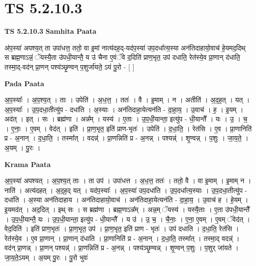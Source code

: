 \documentclass[17pt]{extarticle}
\begin{document}
\section{ TS 5.2.10.3 }

\textbf{TS 5.2.10.3 } \newline
\textbf{Samhita Paata} \newline

अ॑प॒स्या॑ अपश्य॒त् ता उपा॑धत्त॒ ततो॒ वा इ॒मां नात्य॑दह॒द्-यद॑प॒स्या॑ उप॒दधा᳚त्य॒स्या अन॑तिदाहायो॒वाच॑ हे॒यमद॒दिथ् स ब्रह्म॒णाऽन्नं॒ ॅयस्यै॒ता उ॑पधी॒यान्तै॒ य उ॑ चैना ए॒वंॅवे द॒दिति॑ प्राण॒भृत॒ उप॑ दधाति॒ रेत॑स्ये॒व प्रा॒णान् द॑धाति॒ तस्मा॒द्-वद॑न् प्रा॒णन् पश्य॑ञ्छृ॒ण्वन् प॒शुर्जा॑यते॒ ऽयं पु॒रो - [  ] \newline

\textbf{Pada Paata} \newline

अ॒प॒स्याः᳚ । अ॒प॒श्य॒त् । ताः । उपेति॑ । अ॒ध॒त्त॒ । ततः॑ । वै । इ॒माम् । न । अतीति॑ । अ॒द॒ह॒त् । यत् । अ॒प॒स्याः᳚ । उ॒प॒दधा॒तीत्यु॑प - दधा॑ति । अ॒स्याः । अन॑तिदाहा॒येत्यन॑ति - दा॒हा॒य॒ । उ॒वाच॑ । ह॒ । इ॒यम् । अद॑त् । इत् । सः । ब्रह्म॑णा । अन्न᳚म् । यस्य॑ । ए॒ताः । उ॒प॒धी॒यान्ता॒ इत्यु॑प - धी॒यान्तै᳚ । यः । उ॒ । च॒ । ए॒नाः॒ । ए॒वम् । वेद॑त् । इति॑ । प्रा॒ण॒भृत॒ इति॑ प्राण-भृतः॑ । उपेति॑ । द॒धा॒ति॒ । रेत॑सि । ए॒व । प्रा॒णानिति॑ प्र - अ॒नान् । द॒धा॒ति॒ । तस्मा᳚त् । वदन्न्॑ । प्रा॒णन्निति॑ प्र - अ॒नन्न् । पश्यन्न्॑ । शृ॒ण्वन्न् । प॒शुः । जा॒य॒ते॒ । अ॒यम् । पु॒रः ।  \newline


\textbf{Krama Paata} \newline

अ॒प॒स्या॑ अपश्यत् । अ॒प॒श्य॒त् ताः । ता उप॑ । उपा॑धत्त । अ॒ध॒त्त॒ ततः॑ । ततो॒ वै । वा इ॒माम् । इ॒माम् न । नाति॑ । अत्य॑दहत् । अ॒द॒ह॒द् यत् । यद॑प॒स्याः᳚ । अ॒प॒स्या॑ उप॒दधा॑ति । उ॒प॒दधा᳚त्य॒स्याः । उ॒प॒दधा॒तीत्यु॑प - दधा॑ति । अ॒स्या अन॑तिदाहाय । अन॑तिदाहायो॒वाच॑ । अन॑तिदाहा॒येत्यन॑ति - दा॒हा॒य॒ । उ॒वाच॑ ह । हे॒यम् । इ॒यमद॑त् । अद॒दित् । इथ् सः । स ब्रह्म॑णा । ब्रह्म॒णाऽन्न᳚म् । अन्न॒म् ॅयस्य॑ । यस्यै॒ताः । ए॒ता उ॑पधी॒यान्तै᳚ । उ॒प॒धी॒यान्तै॒ यः । उ॒प॒धी॒यान्ता॒ इत्यु॑प - धी॒यान्तै᳚ । य उ॑ । उ॒ च॒ । चै॒नाः॒ । ए॒ना॒ ए॒वम् । ए॒वम् ॅवेद॑त् । वेद॒दिति॑ । इति॑ प्राण॒भृतः॑ । प्रा॒ण॒भृत॒ उप॑ । प्रा॒ण॒भृत॒ इति॑ प्राण - भृतः॑ । उप॑ दधाति । द॒धा॒ति॒ रेत॑सि । रेत॑स्ये॒व । ए॒व प्रा॒णान् । प्रा॒णान् द॑धाति । प्रा॒णानिति॑ प्र - अ॒नान् । द॒धा॒ति॒ तस्मा᳚त् । तस्मा॒द् वदन्न्॑ । वद॑न् प्रा॒णन्न् । प्रा॒णन् पश्यन्न्॑ । प्रा॒णन्निति॑ प्र - अ॒नन्न् । पश्य॑ञ्छृ॒ण्वन्न् । शृ॒ण्वन् प॒शुः । प॒शुर् जा॑यते । जा॒य॒ते॒ऽयम् । अ॒यम् पु॒रः । पु॒रो भुवः॑ \newline
\end{document}
